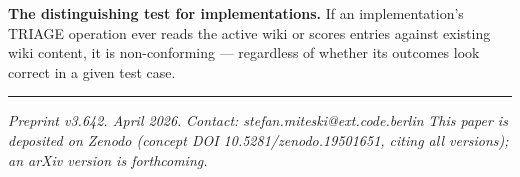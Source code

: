 \documentclass[
  11pt,
]{article}
\begin{document}
\textbf{The distinguishing test for implementations.} If an
implementation's TRIAGE operation ever reads the active wiki or scores
entries against existing wiki content, it is non-conforming ---
regardless of whether its outcomes look correct in a given test case.

\begin{center}\rule{0.5\linewidth}{0.5pt}\end{center}

\emph{Preprint v3.642. April 2026.} \emph{Contact:
stefan.miteski@ext.code.berlin} \emph{This paper is deposited on Zenodo
(concept DOI 10.5281/zenodo.19501651, citing all versions); an arXiv
version is forthcoming.}
\end{document}
